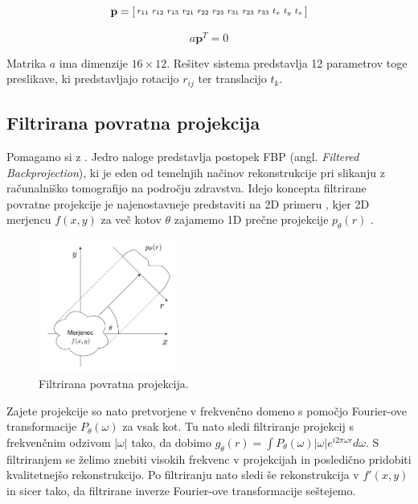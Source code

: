 \documentclass[journal,a4paper,twoside]{sty/IEEEtran}
\begin{document}
\begin{equation}
\setcounter{MaxMatrixCols}{12}
\textbf{p} =
\begin{bsmallmatrix}
r_{11} & r_{12} & r_{13} & r_{21} & r_{22} & r_{23} & r_{31} & r_{23} & r_{33} & t_x & t_y & t_z
\end{bsmallmatrix}
\end{equation}

\begin{equation}
a\textbf{p}^T=0
\end{equation}

Matrika $a$ ima dimenzije $16 \times 12$. Rešitev sistema predstavlja 12 parametrov toge preslikave, ki predstavljajo rotacijo $r_{ij}$ ter translacijo $t_k$.

\subsection{Filtrirana povratna projekcija}

Pomagamo si z \cite{spic1}. Jedro naloge predstavlja postopek FBP (angl. \textit{Filtered Backprojection}), ki je eden od temelnjih načinov rekonstrukcije pri slikanju z računalniško tomografijo na področju zdravstva. Idejo koncepta filtrirane povratne projekcije je najenostavneje predstaviti na 2D primeru , kjer 2D merjencu $f(x,y)$ za več kotov $\theta$ zajamemo 1D prečne projekcije $p_{\theta}(r)$ \cite{vir6}.

\begin{figure}[H]
	\centerline{\includegraphics[width=4.5cm]{fig/FBPderi}}
	\caption{Filtrirana povratna projekcija.}
	\label{fig:fbp_deri}
\end{figure}

Zajete projekcije so nato pretvorjene v frekvenčno domeno s pomočjo Fourier-ove transformacije $P_{\theta}(\omega)$ za vsak kot. Tu nato sledi filtriranje projekcij s frekvenčnim odzivom $|\omega|$ tako, da dobimo $g_{\theta}(r) = \int  P_{\theta}(\omega)|\omega|e^{i 2\pi\omega r} d\omega$. S filtriranjem se želimo znebiti visokih frekvenc v projekcijah in posledično pridobiti kvalitetnejšo rekonstrukcijo. Po filtriranju nato sledi še rekonstrukcija v $f'(x,y)$ in sicer tako, da filtrirane inverze Fourier-ove transformacije seštejemo.
\end{document}

